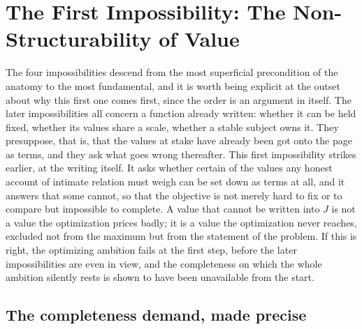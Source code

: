 \section{The First Impossibility: The Non-Structurability of Value}
\label{p25:sec:structurability}

\noindent
The four impossibilities descend from the most superficial precondition of the anatomy to the most fundamental, and it is worth being explicit at the outset about why this first one comes first, since the order is an argument in itself. The later impossibilities all concern a function already written: whether it can be held fixed, whether its values share a scale, whether a stable subject owns it. They presuppose, that is, that the values at stake have already been got onto the page as terms, and they ask what goes wrong thereafter. This first impossibility strikes earlier, at the writing itself. It asks whether certain of the values any honest account of intimate relation must weigh can be set down as terms at all, and it answers that some cannot, so that the objective is not merely hard to fix or to compare but impossible to complete. A value that cannot be written into $J$ is not a value the optimization prices badly; it is a value the optimization never reaches, excluded not from the maximum but from the statement of the problem. If this is right, the optimizing ambition fails at the first step, before the later impossibilities are even in view, and the completeness on which the whole ambition silently rests is shown to have been unavailable from the start.

\subsection*{The completeness demand, made precise}

